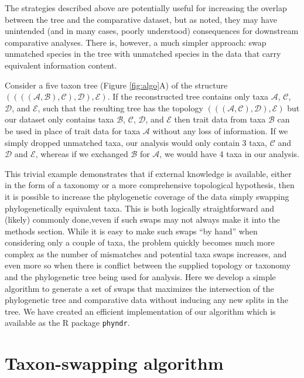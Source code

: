 \documentclass[a4paper,11pt]{article}
\newcommand{\phyndr}{\tt phyndr}
\begin{document}
The strategies described above are potentially useful for increasing the overlap between the tree and the comparative dataset, but as noted, they may have unintended (and in many cases, poorly understood) consequences for downstream comparative analyses. There is, however, a much simpler approach: swap unmatched species in the tree with unmatched species in the data that carry equivalent information content.

Consider a five taxon tree (Figure \ref{fig:algo}A) of the structure $((((\mathcal{A},\mathcal{B}),\mathcal{C}),\mathcal{D}),\mathcal{E})$. If the reconstructed tree contains only taxa $\mathcal{A}$, $\mathcal{C}$, $\mathcal{D}$, and $\mathcal{E}$, such that the resulting tree has the topology $(((\mathcal{A},\mathcal{C}),\mathcal{D}),\mathcal{E})$ but our dataset only contains taxa $\mathcal{B}$, $\mathcal{C}$, $\mathcal{D}$, and $\mathcal{E}$  then trait data from taxa $\mathcal{B}$ can be used in place of trait data for taxa $\mathcal{A}$ without any loss of information. If we simply dropped unmatched taxa, our analysis would only contain 3 taxa, $\mathcal{C}$ and $\mathcal{D}$ and $\mathcal{E}$, whereas if we exchanged $\mathcal{B}$ for $\mathcal{A}$, we would have 4 taxa in our analysis.

This trivial example demonstrates that if external knowledge is available, either in the form of a taxonomy or a more comprehensive topological hypothesis, then it is possible to increase the phylogenetic coverage of the data simply swapping phylogenetically equivalent taxa. This is both logically straightforward and (likely) commonly done,veven if such swaps may not always make it into the methods section. While it is easy to make such swaps ``by hand'' when considering only a couple of taxa, the problem quickly becomes much more complex as the number of mismatches and potential taxa swaps increases, and even more so when there is conflict between the supplied topology or taxonomy and the phylogenetic tree being used for analysis. Here we develop a simple algorithm to generate a set of swaps that maximizes the intersection of the phylogenetic tree and comparative data without inducing any new splits in the tree. We have created an efficient implementation of our algorithm which is available as the R package {\phyndr}.

\section{Taxon-swapping algorithm}
\end{document}
